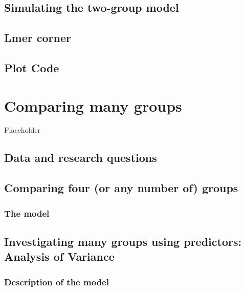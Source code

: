 \documentclass[
]{book}
\begin{document}
\hypertarget{simulating-the-two-group-model}{%
\section{Simulating the two-group model}\label{simulating-the-two-group-model}}

\hypertarget{lmer-corner-1}{%
\section{Lmer corner}\label{lmer-corner-1}}

\hypertarget{plot-code-2}{%
\section{Plot Code}\label{plot-code-2}}

\hypertarget{comparing-many-groups}{%
\chapter{Comparing many groups}\label{comparing-many-groups}}

Placeholder

\hypertarget{data-and-research-questions-3}{%
\section{Data and research questions}\label{data-and-research-questions-3}}

\hypertarget{comparing-four-or-any-number-of-groups}{%
\section{Comparing four (or any number of) groups}\label{comparing-four-or-any-number-of-groups}}

\hypertarget{the-model}{%
\subsection{The model}\label{the-model}}

\hypertarget{investigating-many-groups-using-predictors-analysis-of-variance}{%
\section{Investigating many groups using predictors: Analysis of Variance}\label{investigating-many-groups-using-predictors-analysis-of-variance}}

\hypertarget{description-of-the-model-3}{%
\subsection{Description of the model}\label{description-of-the-model-3}}
\end{document}
